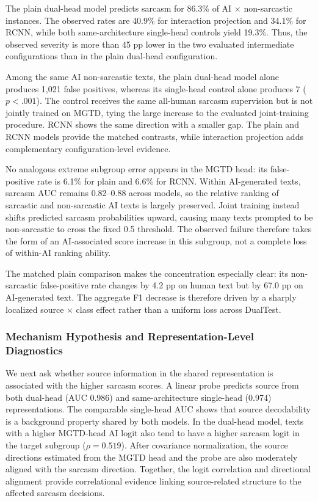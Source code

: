 \documentclass[11pt]{article}
\begin{document}
The plain dual-head model predicts sarcasm for 86.3\% of AI $\times$ non-sarcastic instances. The observed rates are 40.9\% for interaction projection and 34.1\% for RCNN, while both same-architecture single-head controls yield 19.3\%. Thus, the observed severity is more than 45 pp lower in the two evaluated intermediate configurations than in the plain dual-head configuration.

Among the same AI non-sarcastic texts, the plain dual-head model alone produces 1{,}021 false positives, whereas its single-head control alone produces 7 ($p<.001$). The control receives the same all-human sarcasm supervision but is not jointly trained on MGTD, tying the large increase to the evaluated joint-training procedure. RCNN shows the same direction with a smaller gap. The plain and RCNN models provide the matched contrasts, while interaction projection adds complementary configuration-level evidence.

No analogous extreme subgroup error appears in the MGTD head: its false-positive rate is 6.1\% for plain and 6.6\% for RCNN. Within AI-generated texts, sarcasm AUC remains 0.82--0.88 across models, so the relative ranking of sarcastic and non-sarcastic AI texts is largely preserved. Joint training instead shifts predicted sarcasm probabilities upward, causing many texts prompted to be non-sarcastic to cross the fixed 0.5 threshold. The observed failure therefore takes the form of an AI-associated score increase in this subgroup, not a complete loss of within-AI ranking ability.

The matched plain comparison makes the concentration especially clear: its non-sarcastic false-positive rate changes by 4.2 pp on human text but by 67.0 pp on AI-generated text. The aggregate F1 decrease is therefore driven by a sharply localized source $\times$ class effect rather than a uniform loss across DualTest.

\subsubsection{Mechanism Hypothesis and Representation-Level Diagnostics}
\label{sec:mechanism}

We next ask whether source information in the shared representation is associated with the higher sarcasm scores. A linear probe predicts source from both dual-head (AUC 0.986) and same-architecture single-head (0.974) representations. The comparable single-head AUC shows that source decodability is a background property shared by both models. In the dual-head model, texts with a higher MGTD-head AI logit also tend to have a higher sarcasm logit in the target subgroup ($\rho=0.519$). After covariance normalization, the source directions estimated from the MGTD head and the probe are also moderately aligned with the sarcasm direction. Together, the logit correlation and directional alignment provide correlational evidence linking source-related structure to the affected sarcasm decisions.
\end{document}

